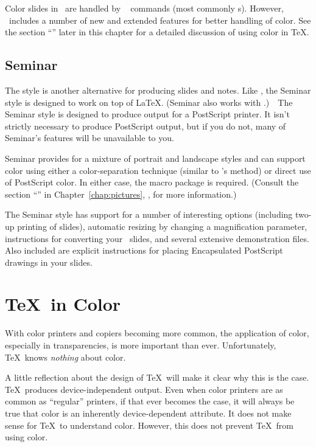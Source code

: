 \newpage
Color slides in \FoilTeX\ are handled by \dvidriver\ 
commands (most commonly  s).  However,
\FoilTeX\ includes a number of new and extended features for better
handling of color.  See the section ``'' later
in this chapter for a detailed discussion of using color in \TeX.

\subsection{Seminar}

The  style is another alternative for producing slides
and notes.  Like \FoilTeX, the Seminar style is designed to work
on top of \LaTeX.  (Seminar also works with \AMSLaTeX.)\ \ The Seminar
style is designed to produce output for a PostScript printer.  It 
isn't strictly necessary to produce PostScript output, but if you do not,
many of Seminar's features will be unavailable to you.

Seminar provides for a mixture of portrait and landscape styles and
can support color using either a color-separation technique (similar
to \SliTeX's method) or direct use of PostScript color.  In either
case, the  macro package is required.  (Consult the
section ``'' in Chapter~\ref{chap:pictures},
{\it {}}, for more information.)

The Seminar style has support for a number of interesting options (including
two-up printing of slides), automatic resizing by changing a magnification
parameter, instructions for converting your \SliTeX\ slides, and several
extensive demonstration files.  Also included are explicit instructions for
placing Encapsulated PostScript drawings in your slides.

\section{\protect\TeX\ in Color}
\label{sec:texincolor}

With color printers and 
copiers becoming more common, the
application of color, especially in transparencies, is more important
than ever.  Unfortunately, \TeX\ knows {\em nothing\/} about color.

A little reflection about the design of \TeX\ will make it clear
why this is the case. \TeX\ produces device-independent output.
Even when color printers are as common as ``regular'' printers, if that
ever becomes the case, it will always be true that color is an inherently
device-dependent attribute.  It does not make sense for \TeX\ to
understand color.  However, this does not prevent \TeX\ from using color.   

